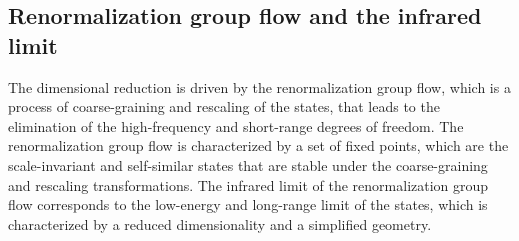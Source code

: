 \subsection{Renormalization group flow and the infrared limit}
The dimensional reduction is driven by the renormalization group flow, which is a process of coarse-graining and rescaling of the states, that leads to the elimination of the high-frequency and short-range degrees of freedom. The renormalization group flow is characterized by a set of fixed points, which are the scale-invariant and self-similar states that are stable under the coarse-graining and rescaling transformations. The infrared limit of the renormalization group flow corresponds to the low-energy and long-range limit of the states, which is characterized by a reduced dimensionality and a simplified geometry.

